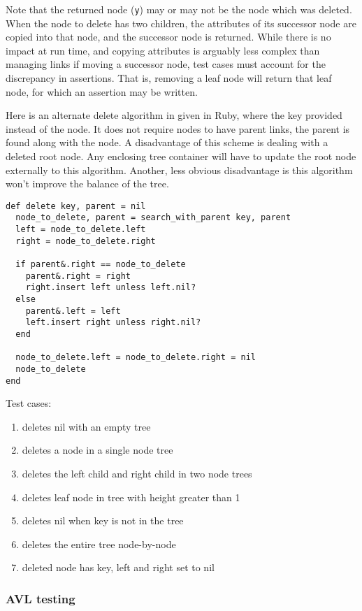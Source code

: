 \documentclass{article}
\begin{document}
Note that the returned node ({\tt y}) may or may not be the node
which was deleted. When the node to delete has two children, the
attributes of its successor node are copied into that node, and the
successor node is returned. While there is no impact at run time,
and copying attributes is arguably less complex than managing links
if moving a successor node, test cases must account for the discrepancy
in assertions. That is, removing a leaf node will return that leaf node,
for which an assertion may be written.

Here is an alternate delete algorithm in given in Ruby,
where the key provided instead of the node.
It does not require nodes to have parent links, the
parent is found along with the node. A disadvantage of
this scheme is dealing with a deleted root node. Any
enclosing tree container will have to update the
root node externally to this algorithm. Another, less
obvious disadvantage is this algorithm won't improve
the balance of the tree.

\begin{lstlisting}[frame=single]
def delete key, parent = nil
  node_to_delete, parent = search_with_parent key, parent
  left = node_to_delete.left
  right = node_to_delete.right

  if parent&.right == node_to_delete
    parent&.right = right
    right.insert left unless left.nil?
  else
    parent&.left = left
    left.insert right unless right.nil?
  end

  node_to_delete.left = node_to_delete.right = nil
  node_to_delete
end
\end{lstlisting}



Test cases:
\begin{enumerate}
\item deletes nil with an empty tree
\item deletes a node in a single node tree
\item deletes the left child and right child in two node trees
\item deletes leaf node in tree with height greater than 1
\item deletes nil when key is not in the tree
\item deletes the entire tree node-by-node
\item deleted node has key, left and right set to nil
\end{enumerate}


\subsubsection{AVL testing}
\end{document}
